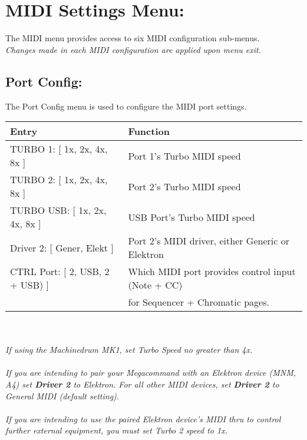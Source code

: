 \chapter{MIDI Settings Menu:}
The MIDI menu provides access to six MIDI configuration sub-menus.
\\
\textit{Changes made in each MIDI configuration are applied upon menu exit.}

\section{Port Config:}
The Port Config menu is used to configure the MIDI port settings.
\\
\begin{tabular}{|l|l|}
\hline
\rowcolor[HTML]{C0C0C0} 
Entry                                  & Function                                                                       \\ \hline
TURBO 1: {[} 1x, 2x, 4x, 8x {]}        & Port 1's Turbo MIDI speed                                                             \\ \hline
TURBO 2: {[} 1x, 2x, 4x, 8x {]}        & Port 2's Turbo MIDI speed                                                             \\ \hline
TURBO USB: {[} 1x, 2x, 4x, 8x {]}      & USB Port's Turbo MIDI speed                                                           \\ \hline
Driver 2: {[} Gener, Elekt {]}         &  Port 2's MIDI driver, either Generic or Elektron                                   \\ \hline
CTRL Port: {[} 2, USB, 2 + USB) {]}    & Which MIDI port provides control input (Note + CC)\\& for Sequencer + Chromatic pages.  \\ \hline                                    
\end{tabular}
\\\\
\textit{If using the Machinedrum MK1, set Turbo Speed no greater than 4x.}\\\\
\textit{{If you are intending to pair your Megacommand with an Elektron device}
(MNM, A4) set \textbf{Driver 2}  to Elektron. For all other MIDI devices, set \textbf{Driver 2} to General MIDI (default setting).}\\\\
\textit{If you are intending to use the paired Elektron device's MIDI thru to control further external equipment, you must set Turbo 2 speed to 1x.}

